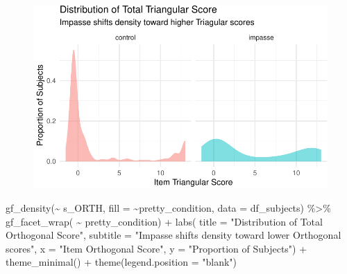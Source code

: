 \documentclass[
  letterpaper,
  DIV=11,
  numbers=noendperiod]{scrreprt}
\newenvironment{Shaded}{\begin{snugshade}}{\end{snugshade}}
\newcommand{\AttributeTok}[1]{\textcolor[rgb]{0.40,0.45,0.13}{#1}}
\newcommand{\FunctionTok}[1]{\textcolor[rgb]{0.28,0.35,0.67}{#1}}
\newcommand{\NormalTok}[1]{\textcolor[rgb]{0.00,0.23,0.31}{#1}}
\newcommand{\SpecialCharTok}[1]{\textcolor[rgb]{0.37,0.37,0.37}{#1}}
\newcommand{\StringTok}[1]{\textcolor[rgb]{0.13,0.47,0.30}{#1}}
\begin{document}
\begin{figure}[H]

{\centering \includegraphics{analysis/SGC3A/2_sgc3A_scoring_files/figure-pdf/DIST-SUBSCORES-1.pdf}

}

\end{figure}

\begin{Shaded}
\begin{Highlighting}[]
\FunctionTok{gf\_density}\NormalTok{(}\SpecialCharTok{\textasciitilde{}}\NormalTok{ s\_ORTH, }\AttributeTok{fill =} \SpecialCharTok{\textasciitilde{}}\NormalTok{pretty\_condition, }\AttributeTok{data =}\NormalTok{ df\_subjects) }\SpecialCharTok{\%\textgreater{}\%} 
  \FunctionTok{gf\_facet\_wrap}\NormalTok{( }\SpecialCharTok{\textasciitilde{}}\NormalTok{ pretty\_condition) }\SpecialCharTok{+} 
  \FunctionTok{labs}\NormalTok{( }\AttributeTok{title =} \StringTok{"Distribution of Total Orthogonal Score"}\NormalTok{,}
        \AttributeTok{subtitle =} \StringTok{"Impasse shifts density toward lower Orthogonal scores"}\NormalTok{,}
        \AttributeTok{x =} \StringTok{"Item Orthogonal Score"}\NormalTok{, }\AttributeTok{y =} \StringTok{"Proportion of Subjects"}\NormalTok{) }\SpecialCharTok{+} 
        \FunctionTok{theme\_minimal}\NormalTok{() }\SpecialCharTok{+} \FunctionTok{theme}\NormalTok{(}\AttributeTok{legend.position =} \StringTok{"blank"}\NormalTok{)}
\end{Highlighting}
\end{Shaded}
\end{document}
